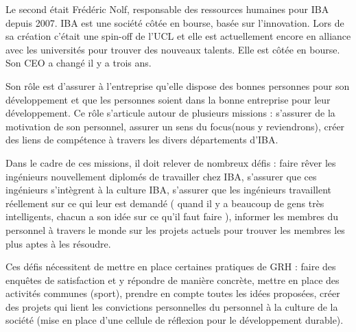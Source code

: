 \documentclass[a4paper, 12pt]{article}
\begin{document}
Le second était Frédéric Nolf, responsable des ressources humaines pour IBA depuis 2007. IBA est une société côtée en bourse, basée sur l'innovation. Lors de sa création c'était une spin-off de l'UCL et elle est actuellement encore en alliance avec les universités pour trouver des nouveaux talents. Elle est côtée en bourse. Son CEO a changé il y a trois ans.

Son rôle est d'assurer à l'entreprise qu'elle dispose des bonnes personnes pour son développement et que les personnes soient dans la bonne entreprise pour leur développement. Ce rôle s'articule autour de plusieurs missions : s'assurer de la motivation de son personnel, assurer un \og{} sens du focus\fg{}(nous y reviendrons), créer des liens de compétence à travers les divers départements d'IBA.


Dans le cadre de ces missions, il doit relever de nombreux défis : faire rêver les ingénieurs nouvellement diplomés de travailler chez IBA, s'assurer que ces ingénieurs s'intègrent à la culture IBA, s'assurer que les ingénieurs travaillent réellement sur ce qui leur est demandé (\og{} quand il y a beaucoup de gens très intelligents, chacun a son idée sur ce qu'il faut faire \fg{}), informer les membres du personnel à travers le monde sur les projets actuels pour trouver les membres les plus aptes à les résoudre.

Ces défis nécessitent de mettre en place certaines pratiques de GRH : faire des enquêtes de satisfaction et y répondre de manière concrète, mettre en place des activités communes (sport), prendre en compte toutes les idées proposées, créer des projets qui lient les convictions personnelles du personnel à la culture de la société (mise en place d'une cellule de réflexion pour le développement durable).











\end{document}
